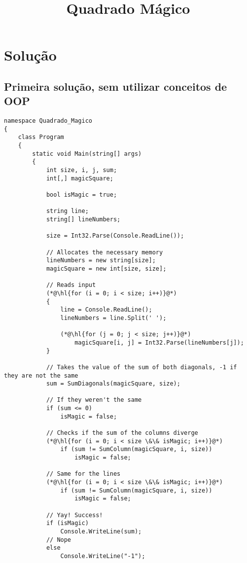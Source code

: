 \documentclass {article}
\title {\bf{Quadrado Mágico}}
\date{\date{19 de Novembro, 2014}}
\begin{document}
	\maketitle
	\section{Solução}
	\subsection{Primeira solução, sem utilizar conceitos de OOP}
	
	\begin{lstlisting}
namespace Quadrado_Magico
{
    class Program
    {
        static void Main(string[] args)
        {
            int size, i, j, sum;
            int[,] magicSquare;

            bool isMagic = true;

            string line;
            string[] lineNumbers;

            size = Int32.Parse(Console.ReadLine());

            // Allocates the necessary memory
            lineNumbers = new string[size];
            magicSquare = new int[size, size];

            // Reads input
            (*@\hl{for (i = 0; i < size; i++)}@*)
            {
                line = Console.ReadLine();
                lineNumbers = line.Split(' ');

                (*@\hl{for (j = 0; j < size; j++)}@*)
                    magicSquare[i, j] = Int32.Parse(lineNumbers[j]);
            }

            // Takes the value of the sum of both diagonals, -1 if they are not the same
            sum = SumDiagonals(magicSquare, size);

            // If they weren't the same
            if (sum <= 0) 
                isMagic = false;

            // Checks if the sum of the columns diverge
            (*@\hl{for (i = 0; i < size \&\& isMagic; i++)}@*) 
                if (sum != SumColumn(magicSquare, i, size))
                    isMagic = false;
                    
            // Same for the lines
            (*@\hl{for (i = 0; i < size \&\& isMagic; i++)}@*) 
                if (sum != SumColumn(magicSquare, i, size))
                    isMagic = false;

            // Yay! Success!
            if (isMagic)
                Console.WriteLine(sum);
            // Nope
            else
                Console.WriteLine("-1");


\end{lstlisting}
\end{document}
